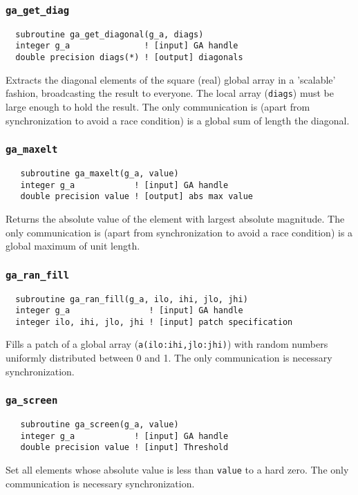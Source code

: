 \subsubsection{{\tt ga\_get\_diag}}
\begin{verbatim}
  subroutine ga_get_diagonal(g_a, diags)
  integer g_a               ! [input] GA handle
  double precision diags(*) ! [output] diagonals
\end{verbatim}
Extracts the diagonal elements of the square (real) global array in a
'scalable' fashion, broadcasting the result to everyone.  The local
array (\verb+diags+) must be large enough to hold the result.  The
only communication is (apart from synchronization to avoid a race
condition) is a global sum of length the diagonal.

\subsubsection{{\tt ga\_maxelt}}
\begin{verbatim}
   subroutine ga_maxelt(g_a, value)
   integer g_a            ! [input] GA handle
   double precision value ! [output] abs max value
\end{verbatim}
Returns the absolute value of the element with largest absolute
magnitude.  The only communication is (apart from synchronization to
avoid a race condition) is a global maximum of unit length.

\subsubsection{{\tt ga\_ran\_fill}}
\begin{verbatim}
  subroutine ga_ran_fill(g_a, ilo, ihi, jlo, jhi)
  integer g_a                ! [input] GA handle
  integer ilo, ihi, jlo, jhi ! [input] patch specification
\end{verbatim}
Fills a patch of a global array (\verb+a(ilo:ihi,jlo:jhi)+) with
random numbers uniformly distributed between 0 and 1.  The only
communication is necessary synchronization.

\subsubsection{{\tt ga\_screen}}
\begin{verbatim}
   subroutine ga_screen(g_a, value)
   integer g_a            ! [input] GA handle
   double precision value ! [input] Threshold
\end{verbatim}
Set all elements whose absolute value is less than {\tt value} to a
hard zero.  The only communication is necessary synchronization.

